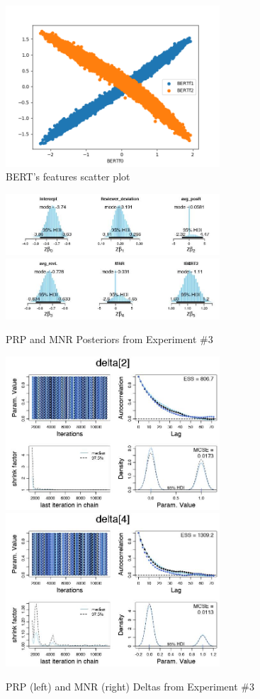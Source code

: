 \documentclass[man, floatsintext, 10pt]{apa6}
\begin{document}
\begin{figure}
\includegraphics[width=8cm]{BERTFeaturesScatterPlot.png}
\caption{BERT's features scatter plot}
\label{BERTf}
\end{figure}

\begin{figure}
\includegraphics[width=8cm]{posteriors_bdata_02.jpg}
\includegraphics[width=8cm]{pposteriors_bdata_02.jpg}
\caption{PRP and MNR Posteriors from Experiment \#3}
\label{PRP_MNR_Posteriors}
\end{figure}

\begin{figure}
\includegraphics[width=8cm]{delta_PR_bdata_02.jpg}
\includegraphics[width=8cm]{delta_MNR_bdata_02.jpg}
\caption{PRP (left) and MNR (right) Deltas from Experiment \#3}
\label{PRP_MNR_Deltas}
\end{figure}
\end{document}
